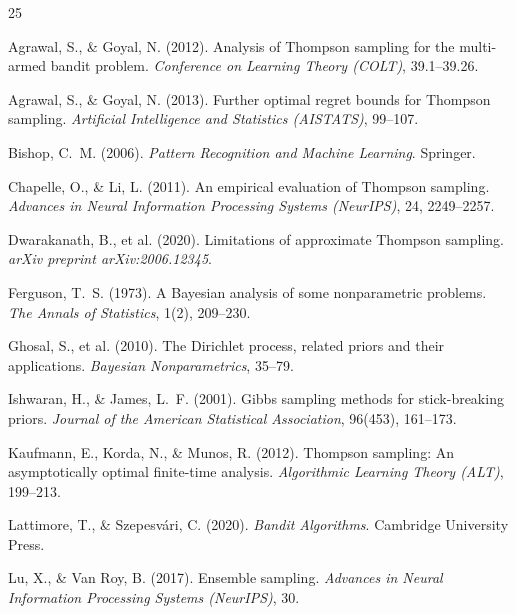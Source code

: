 \documentclass[twoside]{article}
\begin{document}

\begin{thebibliography}{25}
\providecommand{\natexlab}[1]{#1}

Agrawal, S., \& Goyal, N. (2012).
Analysis of Thompson sampling for the multi-armed bandit problem.
\emph{Conference on Learning Theory (COLT)}, 39.1--39.26.

Agrawal, S., \& Goyal, N. (2013).
Further optimal regret bounds for Thompson sampling.
\emph{Artificial Intelligence and Statistics (AISTATS)}, 99--107.

Bishop, C.~M. (2006).
\emph{Pattern Recognition and Machine Learning}.
Springer.

Chapelle, O., \& Li, L. (2011).
An empirical evaluation of Thompson sampling.
\emph{Advances in Neural Information Processing Systems (NeurIPS)}, 24, 2249--2257.

Dwarakanath, B., et al. (2020).
Limitations of approximate Thompson sampling.
\emph{arXiv preprint arXiv:2006.12345}.

Ferguson, T.~S. (1973).
A Bayesian analysis of some nonparametric problems.
\emph{The Annals of Statistics}, 1(2), 209--230.

Ghosal, S., et al. (2010).
The Dirichlet process, related priors and their applications.
\emph{Bayesian Nonparametrics}, 35--79.

Ishwaran, H., \& James, L.~F. (2001).
Gibbs sampling methods for stick-breaking priors.
\emph{Journal of the American Statistical Association}, 96(453), 161--173.

Kaufmann, E., Korda, N., \& Munos, R. (2012).
Thompson sampling: An asymptotically optimal finite-time analysis.
\emph{Algorithmic Learning Theory (ALT)}, 199--213.

Lattimore, T., \& Szepesv{\'a}ri, C. (2020).
\emph{Bandit Algorithms}.
Cambridge University Press.

Lu, X., \& Van Roy, B. (2017).
Ensemble sampling.
\emph{Advances in Neural Information Processing Systems (NeurIPS)}, 30.


\end{thebibliography}
\end{document}
